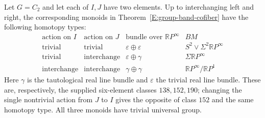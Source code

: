 \begin{corollary}\label{E:three-Thom}
Let $G=C_2$ and let each of $I,J$ have two elements. Up to interchanging
left and right, the corresponding monoids in
Theorem~\ref{E:group-band-cofiber} have the following homotopy types:
\[
\begin{array}{c|c|c|c}
\text{action on }I&\text{action on }J&\text{bundle over }\mathbb RP^\infty
 &BM\\\hline
\text{trivial}&\text{trivial}&\varepsilon\oplus\varepsilon
 &S^2\vee\Sigma^2\mathbb RP^\infty\\
\text{trivial}&\text{interchange}&\varepsilon\oplus\gamma
 &\Sigma\mathbb RP^\infty\\
\text{interchange}&\text{interchange}&\gamma\oplus\gamma
 &\mathbb RP^\infty/\mathbb RP^1
\end{array}
\]
Here $\gamma$ is the tautological real line bundle and $\varepsilon$ the
trivial real line bundle. These are, respectively, the supplied
six-element classes $138,152,190$; changing the single nontrivial action
from $J$ to $I$ gives the opposite of class $152$ and the same homotopy type.
All three monoids have trivial universal group.
\end{corollary}

